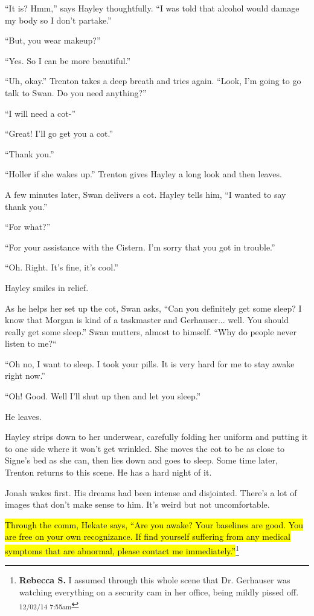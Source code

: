 ``It is?  Hmm,'' says Hayley thoughtfully.  ``I was told that alcohol would damage my body so I don't partake.''

``But, you wear makeup?''

``Yes. So I can be more beautiful.''

``Uh, okay.'' Trenton takes a deep breath and tries again.  ``Look, I'm going to go talk to Swan.  Do you need anything?''

``I will need a cot-''

``Great!  I'll go get you a cot.''

``Thank you.''

``Holler if she wakes up.''  Trenton gives Hayley a long look and then leaves.



A few minutes later, Swan delivers a cot.  Hayley tells him, ``I wanted to say thank you.''

``For what?''

``For your assistance with the Cistern.  I'm sorry that you got in trouble.''

``Oh. Right.  It's fine, it's cool.''

Hayley smiles in relief.

As he helps her set up the cot, Swan asks, ``Can you definitely get some sleep?  I know that Morgan is kind of a taskmaster and Gerhauser... well.  You should really get some sleep.''  Swan mutters, almost to himself.  ``Why do people never listen to me?``

``Oh no, I want to sleep. I took your pills.  It is very hard for me to stay awake right now.''

``Oh!  Good.  Well I'll shut up then and let you sleep.''

He leaves.

Hayley strips down to her underwear, carefully folding her uniform and putting it to one side where it won't get wrinkled.  She moves the cot to be as close to Signe's bed as she can, then lies down and goes to sleep.  Some time later, Trenton returns to this scene.  He has a hard night of it.





Jonah wakes first.  His dreams had been intense and disjointed. There's a lot of images that don't make sense to him.  It's weird but not uncomfortable.  

\hl{Through the comm, Hekate says, ``Are you awake?  Your baselines are good.  You are free on your own recognizance.  If find yourself suffering from any medical symptoms that are abnormal, please contact me immediately.''}\footnote{\textbf{Rebecca S. }I assumed through this whole scene that Dr. Gerhauser was watching everything on a security cam in her office, being mildly pissed off. \textsubscript{12/02/14 7:55am}}

